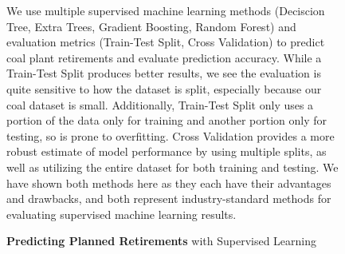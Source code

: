 \begin{figure}[h!]
    \centering
      
    \caption{\textbf{Predicting Planned Retirements} with Supervised Learning}
    \medskip
    \footnotesize

    \smallskip  %
    
    We use multiple supervised machine learning methods (Deciscion Tree, Extra Trees, Gradient Boosting, Random Forest) and evaluation metrics (Train-Test Split, Cross Validation) to predict coal plant retirements and evaluate prediction accuracy.
    While a Train-Test Split produces  better results, we see the evaluation is quite sensitive to how the dataset is split, especially because our coal dataset is small. Additionally, Train-Test Split only uses a portion of the data only for training and another portion only for testing, so is prone to overfitting.
    Cross Validation provides a more robust estimate of model performance by using multiple splits, as well as utilizing the entire dataset for both training and testing. We have shown both methods here as they each have their advantages and drawbacks, and both represent industry-standard methods for evaluating supervised machine learning results.
    \label{fig:ML-Predictions}
\end{figure}

